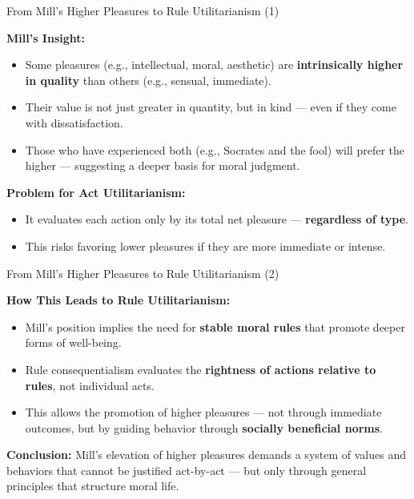 \documentclass[aspectratio=169, 10pt]{beamer}
\begin{document}
\begin{frame}{From Mill’s Higher Pleasures to Rule Utilitarianism (1)}

\textbf{Mill’s Insight:}
\begin{itemize}
    \item Some pleasures (e.g., intellectual, moral, aesthetic) are \textbf{intrinsically higher in quality} than others (e.g., sensual, immediate).
    \item Their value is not just greater in quantity, but in kind — even if they come with dissatisfaction.
    \item Those who have experienced both (e.g., Socrates and the fool) will prefer the higher — suggesting a deeper basis for moral judgment.
\end{itemize}

\vspace{1em}

\textbf{Problem for Act Utilitarianism:}
\begin{itemize}
    \item It evaluates each action only by its total net pleasure — \textbf{regardless of type}.
    \item This risks favoring lower pleasures if they are more immediate or intense.
\end{itemize}

\end{frame}

\begin{frame}{From Mill’s Higher Pleasures to Rule Utilitarianism (2)}

\textbf{How This Leads to Rule Utilitarianism:}
\begin{itemize}
    \item Mill’s position implies the need for \textbf{stable moral rules} that promote deeper forms of well-being.
    \item Rule consequentialism evaluates the \textbf{rightness of actions relative to rules}, not individual acts.
    \item This allows the promotion of higher pleasures — not through immediate outcomes, but by guiding behavior through \textbf{socially beneficial norms}.
\end{itemize}

\vspace{1em}
\textbf{Conclusion:}  
Mill’s elevation of higher pleasures demands a system of values and behaviors that cannot be justified act-by-act — but only through general principles that structure moral life.

\end{frame}
\end{document}
